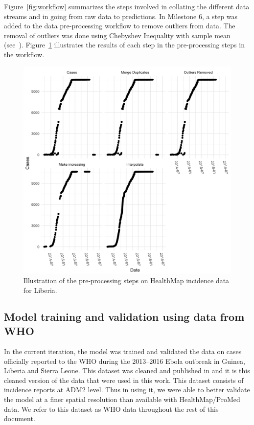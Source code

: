 \documentclass[11pt,]{article}
\begin{document}
Figure~\ref{fig:workflow} summarizes the steps involved in collating
the different data streams and in going from raw data to predictions. In Milestone 6, a step was added to the data pre-processing workflow
to remove outliers from data. The removal of outliers was done using Chebyshev Inequality
with sample mean (see~\cite{saw1984chebyshev}). Figure~\ref{fig:wf_example} illustrates
the results of each step in the pre-processing steps in the workflow.

\begin{figure}
  \centering
  \includegraphics{ms6-figures/liberia-preprocessing}
  \caption{Illustration of the pre-processing steps on HealthMap incidence
    data for Liberia.}
  \label{fig:wf_example}
\end{figure}

\subsection{Model training and validation using data from
WHO}\label{model-training-and-validation-using-data-from-who}

In the current iteration, the model was trained and validated the data
on cases officially reported to the WHO during the 2013--2016 Ebola
outbreak in Guinea, Liberia and Sierra Leone. This dataset was cleaned
and published in \citep{garske20160308} and it is this cleaned version
of the data that were used in this work. This dataset consists of
incidence reports at ADM2 level. Thus in using it, we were able to
better validate the model at a finer spatial resolution than available
with HealthMap/ProMed data. We refer to this dataset as WHO data
throughout the rest of this document.
\end{document}
